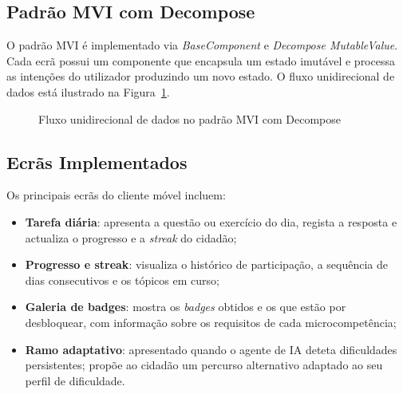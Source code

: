 \subsection*{Padrão MVI com Decompose}

O padrão MVI é implementado via \textit{BaseComponent} e \textit{Decompose MutableValue}. Cada ecrã possui um componente que encapsula um estado imutável e processa as intenções do utilizador produzindo um novo estado. O fluxo unidirecional de dados está ilustrado na Figura~\ref{fig:mvi}.

\begin{figure}[htbp]
  \centering
  \caption{Fluxo unidirecional de dados no padrão MVI com Decompose}
  \label{fig:mvi}
\end{figure}

\subsection*{Ecrãs Implementados}

Os principais ecrãs do cliente móvel incluem:

\begin{itemize}
  \item \textbf{Tarefa diária}: apresenta a questão ou exercício do dia, regista a resposta e actualiza o progresso e a \textit{streak} do cidadão;
  \item \textbf{Progresso e streak}: visualiza o histórico de participação, a sequência de dias consecutivos e os tópicos em curso;
  \item \textbf{Galeria de badges}: mostra os \textit{badges} obtidos e os que estão por desbloquear, com informação sobre os requisitos de cada microcompetência;
  \item \textbf{Ramo adaptativo}: apresentado quando o agente de IA deteta dificuldades persistentes; propõe ao cidadão um percurso alternativo adaptado ao seu perfil de dificuldade.
\end{itemize}

